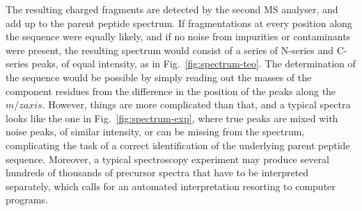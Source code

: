 The resulting charged fragments are detected by the second MS analyser, and add
up to the parent peptide spectrum.
If  fragmentations at every position along the sequence were equally likely, and
if no noise from impurities or contaminants were present, the resulting spectrum
would consist of a series of N-series and C-series peaks, of equal intensity, as
in Fig.~\ref{fig:spectrum-teo}.
The determination of the sequence would be possible by simply reading out the
masses of the component residues from the difference in the position of the
peaks along the $m/z axis$. However, things are more complicated than that, and
a typical spectra looks like the one in Fig.~\ref{fig:spectrum-exp}, 
where true peaks are mixed with noise peaks, of similar
intensity, or can be missing from the spectrum, complicating the task of a
correct identification of the underlying parent peptide sequence.
Moreover, a typical spectroscopy experiment may produce several hundreds of thousands of
precursor spectra that have to be interpreted separately, which calls for an
automated  interpretation resorting to computer programs.

